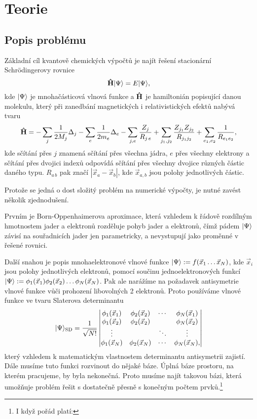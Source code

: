 \chapter{Teorie}
\section{Popis problému}
\label{approx}
Základní cíl kvantově chemických výpočtů je najít řešení stacionární Schrödingerovy rovnice
\begin{equation}
\mathbf{\hat{H}}| \Psi \rangle = E| \Psi \rangle,
\end{equation}
kde $| \Psi \rangle$ je mnohačásticová vlnová funkce a $\mathbf{\hat{H}}$ je hamiltonián popisující 
danou molekulu, který při zanedbání magnetických i relativistických efektů nabývá tvaru
\begin{equation}
\mathbf{\hat{H}} =-\sum_{j}\frac{1}{2M_j}\Delta_j 
-\sum_{e}\frac{1}{2m_e}\Delta_e
 -\sum_{j,e} \frac{Z_{j}}{R_{j\,e}}
 +\sum_{j_1,j_2} \frac{Z_{j_1}Z_{j_2}}{R_{j_1 j_2}} 
 +\sum_{e_1,e_2} \frac{1}{R_{e_1 e_2}},
\end{equation}
kde sčítání přes $j$ znamená sčítání přes všechna jádra, $e$ přes všechny elektrony a sčítání přes 
dvojici indexů odpovídá sčítání přes všechny dvojice různých částic daného typu. 
$R_{a\,b}$ pak značí $|\vec{x}_a - \vec{x}_b|$, kde $\vec{x}_{a,b}$ jsou polohy 
jednotlivých částic.

Protože se jedná o dost složitý problém na numerické výpočty, je nutné zavést 
několik zjednodušení. 

Prvním je Born-Oppenhaimerova aproximace, která vzhledem k řádově 
rozdílným hmotnostem jader a elektronů rozděluje pohyb jader a elektronů, čímž pádem 
$| \Psi \rangle$ závisí na souřadnicích jader jen parametricky, 
a nevystupují jako proměnné v 
řešené rovnici. 

Další snahou je popis mnohaelektronové vlnové funkce
$| \Psi \rangle:= f(\vec{x}_1 \dots \vec{x}_N)$, kde $\vec{x}_i$ jsou 
polohy jednotlivých elektronů, pomocí součinu jednoelektronových funkcí
$| \Psi \rangle:= \phi_1(\vec{x}_1)\phi_2(\vec{x}_2)\dots \phi_N(\vec{x}_N)$.
Pak ale narážíme na požadavek antisymetrie vlnové funkce vůči prohození libovolných 2 
elektronů. Proto používáme vlnové funkce ve tvaru Slaterova determinantu
\begin{equation}
| \Psi \rangle_{\mathrm{SD}} = \frac{1}{\sqrt{N!}}\begin{vmatrix}
\phi_1(\vec{x}_1) & \phi_2(\vec{x}_2)& \cdots & \phi_N(\vec{x}_1) \\
\phi_1(\vec{x}_2) & \phi_2(\vec{x}_2)&        & \phi_N(\vec{x}_2)\\
\vdots         &               & \ddots & \vdots \\
\phi_1(\vec{x}_N) & \phi_2(\vec{x}_N)& \cdots & \phi_N(\vec{x}_N),
\end{vmatrix}
\end{equation}
který vzhledem k matematickým vlastnostem determinantu antisymetrii zajistí.
Dále musíme tuto funkci rozvinout do nějaké báze. Úplná báze prostoru, na kterém 
pracujeme, by byla nekonečná. Proto musíme najít takovou bázi, která umožňuje problém 
řešit s dostatečně přesně s konečným počtem prvků.\footnote{I když pořád platí: }
